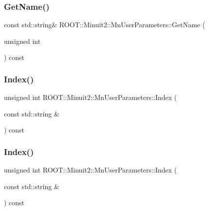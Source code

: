 \subsubsection{\texorpdfstring{GetName()}{GetName()}\hspace{0.1cm}{\footnotesize\ttfamily [3/3]}}
{\footnotesize\ttfamily const std\+::string\& R\+O\+O\+T\+::\+Minuit2\+::\+Mn\+User\+Parameters\+::\+Get\+Name (\begin{DoxyParamCaption}\item[{unsigned int}]{ }\end{DoxyParamCaption}) const}

\mbox{\label{classROOT_1_1Minuit2_1_1MnUserParameters_a30523af61ec1c817b0eb060d560f9a95}} 
\subsubsection{\texorpdfstring{Index()}{Index()}\hspace{0.1cm}{\footnotesize\ttfamily [1/3]}}
{\footnotesize\ttfamily unsigned int R\+O\+O\+T\+::\+Minuit2\+::\+Mn\+User\+Parameters\+::\+Index (\begin{DoxyParamCaption}\item[{const std\+::string \&}]{ }\end{DoxyParamCaption}) const}

\mbox{\label{classROOT_1_1Minuit2_1_1MnUserParameters_a30523af61ec1c817b0eb060d560f9a95}} 
\subsubsection{\texorpdfstring{Index()}{Index()}\hspace{0.1cm}{\footnotesize\ttfamily [2/3]}}
{\footnotesize\ttfamily unsigned int R\+O\+O\+T\+::\+Minuit2\+::\+Mn\+User\+Parameters\+::\+Index (\begin{DoxyParamCaption}\item[{const std\+::string \&}]{ }\end{DoxyParamCaption}) const}

